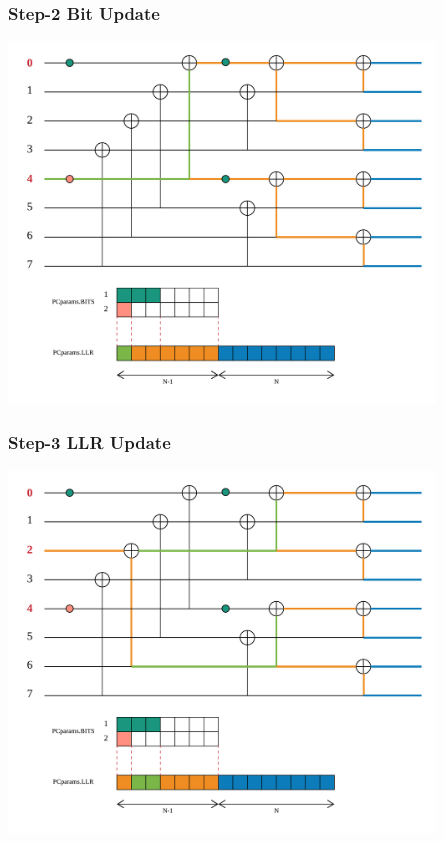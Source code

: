 \documentclass{beamer}
\begin{document}
\begin{frame}
\frametitle{Step-2 Bit Update}
  \begin{center}
  \includegraphics[width=0.85\textwidth]{pics/polar_-_SC_bit_2.png}
  \end{center}
\end{frame}

\begin{frame}
\frametitle{Step-3 LLR Update}
  \begin{center}
  \includegraphics[width=0.85\textwidth]{pics/polar_-_SC_llr_3.png}
  \end{center}
\end{frame}
\end{document}

